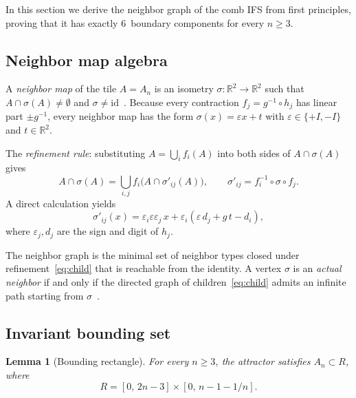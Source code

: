 \documentclass{amsart}
\newtheorem{lemma}[theorem]{Lemma}
\theoremstyle{definition}
\theoremstyle{remark}
\newcommand{\R}{\mathbb{R}}
\begin{document}
In this section we derive the neighbor graph of the comb IFS from first
principles, proving that it has exactly $6$~boundary components for every
$n \ge 3$.

\subsection{Neighbor map algebra}

A \emph{neighbor map} of the tile $A = A_n$ is an isometry
$\sigma \colon \R^2 \to \R^2$ such that $A \cap \sigma(A) \ne \emptyset$
and $\sigma \ne \mathrm{id}$~\cite{bandt1991,scheicher-thuswaldner}.  Because every contraction
$f_j = g^{-1} \circ h_j$ has linear part $\pm g^{-1}$, every neighbor
map has the form $\sigma(x) = \varepsilon x + t$ with
$\varepsilon \in \{+I, -I\}$ and $t \in \R^2$.

The \emph{refinement rule}: substituting $A = \bigcup_i f_i(A)$ into
both sides of $A \cap \sigma(A)$ gives
\[
  A \cap \sigma(A)
  = \bigcup_{i,j} f_i\bigl(A \cap \sigma'_{ij}(A)\bigr),
  \qquad
  \sigma'_{ij} = f_i^{-1} \circ \sigma \circ f_j.
\]
A direct calculation yields
\begin{equation}\label{eq:child}
  \sigma'_{ij}(x)
  = \varepsilon_i\varepsilon\varepsilon_j\, x
  + \varepsilon_i(\varepsilon\, d_j + g\,t - d_i),
\end{equation}
where $\varepsilon_j, d_j$ are the sign and digit of $h_j$.

The neighbor graph is the minimal set of neighbor types closed under
refinement~\eqref{eq:child} that is reachable from the identity.
A vertex $\sigma$ is an \emph{actual neighbor} if and only if the
directed graph of children~\eqref{eq:child} admits an infinite path
starting from $\sigma$~\cite{lau-ngai}.

\subsection{Invariant bounding set}

\begin{lemma}[Bounding rectangle]\label{lem:bound}
For every $n \ge 3$, the attractor satisfies
$A_n \subset R$, where
\begin{equation}\label{eq:bound-R}
  R = [0,\, 2n{-}3] \times [0,\, n{-}1{-}1/n].
\end{equation}
\end{lemma}
\end{document}
